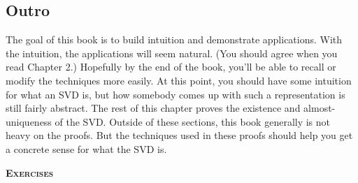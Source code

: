 \documentclass{amsbook}
\begin{document}
\subsection{Outro}

The goal of this book is to build intuition and demonstrate applications.  With the intuition, the applications will seem natural.  (You should agree when you read Chapter 2.)  Hopefully by the end of the book, you'll be able to recall or modify the techniques more easily.  At this point, you should have some intuition for what an SVD is, but how somebody comes up with such a representation is still fairly abstract.  The rest of this chapter proves the existence and almost-uniqueness of the SVD.  Outside of these sections, this book generally is not heavy on the proofs.  But the techniques used in these proofs should help you get a concrete sense for what the SVD is.

{\bfseries\scshape\Large Exercises}
\end{document}
